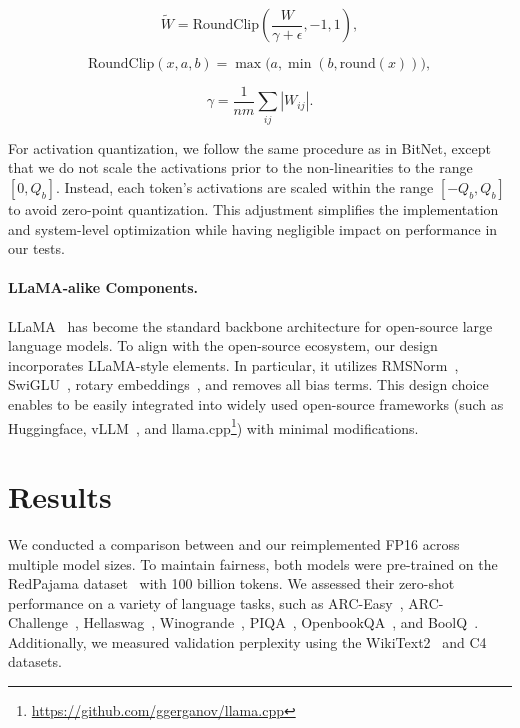 \begin{equation}
    \widetilde{W} = \mathrm{RoundClip}\left(\frac{W}{\gamma + \epsilon}, -1, 1\right),
\end{equation}

\begin{equation}
    \mathrm{RoundClip}(x, a, b) = \max\bigl(a, \min(b, \mathrm{round}(x))\bigr),
\end{equation}

\begin{equation}
    \gamma = \frac{1}{nm}\sum_{ij} |W_{ij}|.
\end{equation}

For activation quantization, we follow the same procedure as in BitNet, except that we do not scale the activations prior to the non-linearities to the range $[0, Q_b]$. Instead, each token’s activations are scaled within the range $[-Q_b, Q_b]$ to avoid zero-point quantization. This adjustment simplifies the implementation and system-level optimization while having negligible impact on performance in our tests.

\paragraph{LLaMA-alike Components.}

LLaMA~\cite{llama, llama2} has become the standard backbone architecture for open-source large language models. To align with the open-source ecosystem, our  design incorporates LLaMA-style elements. In particular, it utilizes RMSNorm~\cite{rmsnorm}, SwiGLU~\cite{swiglu}, rotary embeddings~\cite{rope}, and removes all bias terms. This design choice enables  to be easily integrated into widely used open-source frameworks (such as Huggingface, vLLM~\cite{vllm}, and llama.cpp\footnote{\url{https://github.com/ggerganov/llama.cpp}}) with minimal modifications.

\section{Results}

We conducted a comparison between  and our reimplemented FP16  across multiple model sizes. To maintain fairness, both models were pre-trained on the RedPajama dataset~\cite{redpajama} with 100 billion tokens. We assessed their zero-shot performance on a variety of language tasks, such as ARC-Easy~\cite{arc}, ARC-Challenge~\cite{arc}, Hellaswag~\cite{hellaswag}, Winogrande~\cite{winoGrande}, PIQA~\cite{piqa}, OpenbookQA~\cite{openbookqa}, and BoolQ~\cite{boolq}. Additionally, we measured validation perplexity using the WikiText2~\cite{wikitext2} and C4~\cite{c4} datasets.

